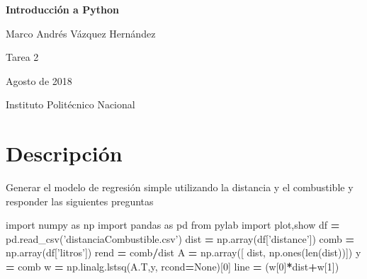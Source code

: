 \documentclass[]{article}
\title{}
\author{}
\date{}
\newenvironment{Shaded}{\begin{snugshade}}{\end{snugshade}}
\newcommand{\DecValTok}[1]{\textcolor[rgb]{0.00,0.00,0.81}{#1}}
\newcommand{\StringTok}[1]{\textcolor[rgb]{0.31,0.60,0.02}{#1}}
\newcommand{\ImportTok}[1]{#1}
\newcommand{\VariableTok}[1]{\textcolor[rgb]{0.00,0.00,0.00}{#1}}
\newcommand{\OperatorTok}[1]{\textcolor[rgb]{0.81,0.36,0.00}{\textbf{#1}}}
\newcommand{\BuiltInTok}[1]{#1}
\newcommand{\NormalTok}[1]{#1}
\begin{document}
\begin{centering}

\vspace*{5 cm}

\Huge

{\bf Introducción a Python}

\vspace{3 cm}

\Large
Marco Andrés Vázquez Hernández

\vspace{1 cm}
\normalsize
Tarea 2

Agosto de 2018

\normalsize
Instituto Politécnico Nacional


\end{centering}

\newpage

\section{Descripción}\label{descripcion}

Generar el modelo de regresión simple utilizando la distancia y el
combustible y responder las siguientes preguntas

\begin{Shaded}
\begin{Highlighting}[]
\ImportTok{import}\NormalTok{ numpy }\ImportTok{as}\NormalTok{ np}
\ImportTok{import}\NormalTok{ pandas }\ImportTok{as}\NormalTok{ pd}
\ImportTok{from}\NormalTok{ pylab }\ImportTok{import}\NormalTok{ plot,show}
\NormalTok{df }\OperatorTok{=}\NormalTok{ pd.read_csv(}\StringTok{'distanciaCombustible.csv'}\NormalTok{)}
\NormalTok{dist }\OperatorTok{=}\NormalTok{ np.array(df[}\StringTok{'distance'}\NormalTok{])}
\NormalTok{comb }\OperatorTok{=}\NormalTok{ np.array(df[}\StringTok{'litros'}\NormalTok{])}
\NormalTok{rend }\OperatorTok{=}\NormalTok{ comb}\OperatorTok{/}\NormalTok{dist}
\NormalTok{A }\OperatorTok{=}\NormalTok{ np.array([ dist, np.ones(}\BuiltInTok{len}\NormalTok{(dist))])}
\NormalTok{y }\OperatorTok{=}\NormalTok{ comb}
\NormalTok{w }\OperatorTok{=}\NormalTok{ np.linalg.lstsq(A.T,y, rcond}\OperatorTok{=}\VariableTok{None}\NormalTok{)[}\DecValTok{0}\NormalTok{]}
\NormalTok{line }\OperatorTok{=}\NormalTok{ (w[}\DecValTok{0}\NormalTok{]}\OperatorTok{*}\NormalTok{dist}\OperatorTok{+}\NormalTok{w[}\DecValTok{1}\NormalTok{])}
\end{Highlighting}
\end{Shaded}
\end{document}
